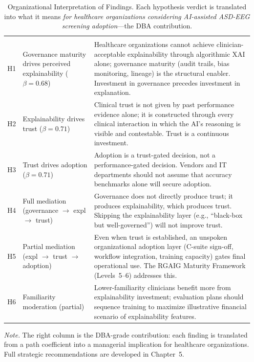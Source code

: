 {\tablestripes\tablefontsize
\begin{xltabular}{\textwidth}{@{} >{\centering\arraybackslash}p{0.7cm} L L @{}}
\caption[Organizational Interpretation of Findings]{Organizational Interpretation of Findings. Each hypothesis verdict is translated into what it means \emph{for healthcare organizations considering AI-assisted ASD-EEG screening adoption}---the DBA contribution.}\label{tab:ch4_org_interpretation} \\
\toprule
{} &  &  \\
\midrule
\endfirsthead
\toprule
{} &  &  \\
\midrule
\endhead
\bottomrule
\endlastfoot
H1 & Governance maturity drives perceived explainability ($\beta=0.68$)  & Healthcare organizations cannot achieve clinician-acceptable explainability through algorithmic XAI alone; governance maturity (audit trails, bias monitoring, lineage) is the structural enabler. Investment in governance precedes investment in explanation. \\
H2 & Explainability drives trust ($\beta=0.71$)                          & Clinical trust is not given by past performance evidence alone; it is constructed through every clinical interaction in which the AI's reasoning is visible and contestable. Trust is a continuous investment. \\
H3 & Trust drives adoption ($\beta=0.71$)                                & Adoption is a trust-gated decision, not a performance-gated decision. Vendors and IT departments should not assume that accuracy benchmarks alone will secure adoption. \\
H4 & Full mediation (governance $\to$ expl $\to$ trust)                  & Governance does not directly produce trust; it produces explainability, which produces trust. Skipping the explainability layer (e.g., ``black-box but well-governed'') will not improve trust. \\
H5 & Partial mediation (expl $\to$ trust $\to$ adoption)                 & Even when trust is established, an unspoken organizational adoption layer (C-suite sign-off, workflow integration, training capacity) gates final operational use. The RGAIG Maturity Framework (Levels~5--6) addresses this. \\
H6 & Familiarity moderation (partial)                                    & Lower-familiarity clinicians benefit more from explainability investment; evaluation plans should sequence training to maximize illustrative financial scenario of explainability features. \\
\end{xltabular}}
\vspace{0.4em}
\noindent\textit{Note.} The right column is the DBA-grade contribution: each finding is translated from a path coefficient into a managerial implication for healthcare organizations. Full strategic recommendations are developed in Chapter~5.

